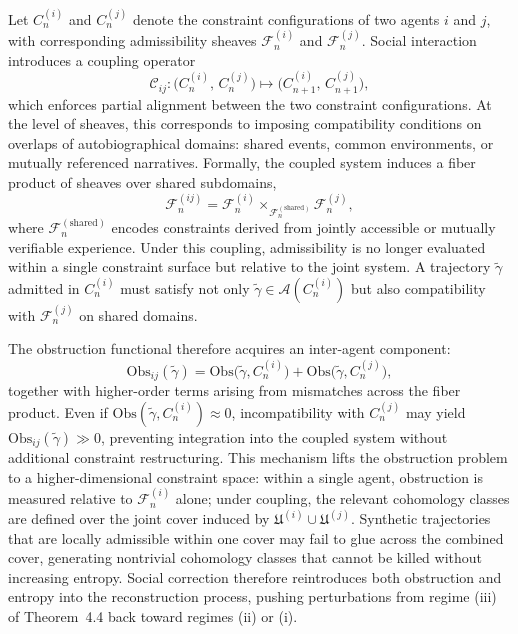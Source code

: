 \documentclass[12pt, a4paper]{article}
\begin{document}
Let $C_n^{(i)}$ and $C_n^{(j)}$ denote the constraint configurations of two agents $i$ and $j$, with corresponding admissibility sheaves $\mathcal{F}_n^{(i)}$ and $\mathcal{F}_n^{(j)}$. Social interaction introduces a coupling operator
\[
\mathcal{C}_{ij} : \bigl(C_n^{(i)},\, C_n^{(j)}\bigr) \longmapsto \bigl(C_{n+1}^{(i)},\, C_{n+1}^{(j)}\bigr),
\]
which enforces partial alignment between the two constraint configurations. At the level of sheaves, this corresponds to imposing compatibility conditions on overlaps of autobiographical domains: shared events, common environments, or mutually referenced narratives. Formally, the coupled system induces a fiber product of sheaves over shared subdomains,
\[
\mathcal{F}_n^{(ij)} = \mathcal{F}_n^{(i)} \times_{\mathcal{F}_n^{(\mathrm{shared})}} \mathcal{F}_n^{(j)},
\]
where $\mathcal{F}_n^{(\mathrm{shared})}$ encodes constraints derived from jointly accessible or mutually verifiable experience. Under this coupling, admissibility is no longer evaluated within a single constraint surface but relative to the joint system. A trajectory $\tilde{\gamma}$ admitted in $C_n^{(i)}$ must satisfy not only $\tilde{\gamma} \in \mathcal{A}(C_n^{(i)})$ but also compatibility with $\mathcal{F}_n^{(j)}$ on shared domains.

The obstruction functional therefore acquires an inter-agent component:
\[
\mathrm{Obs}_{ij}(\tilde{\gamma}) = \mathrm{Obs}\bigl(\tilde{\gamma}, C_n^{(i)}\bigr) + \mathrm{Obs}\bigl(\tilde{\gamma}, C_n^{(j)}\bigr),
\]
together with higher-order terms arising from mismatches across the fiber product. Even if $\mathrm{Obs}(\tilde{\gamma}, C_n^{(i)}) \approx 0$, incompatibility with $C_n^{(j)}$ may yield $\mathrm{Obs}_{ij}(\tilde{\gamma}) \gg 0$, preventing integration into the coupled system without additional constraint restructuring. This mechanism lifts the obstruction problem to a higher-dimensional constraint space: within a single agent, obstruction is measured relative to $\mathcal{F}_n^{(i)}$ alone; under coupling, the relevant cohomology classes are defined over the joint cover induced by $\mathfrak{U}^{(i)} \cup \mathfrak{U}^{(j)}$. Synthetic trajectories that are locally admissible within one cover may fail to glue across the combined cover, generating nontrivial cohomology classes that cannot be killed without increasing entropy. Social correction therefore reintroduces both obstruction and entropy into the reconstruction process, pushing perturbations from regime (iii) of Theorem~4.4 back toward regimes (ii) or (i).
\end{document}

